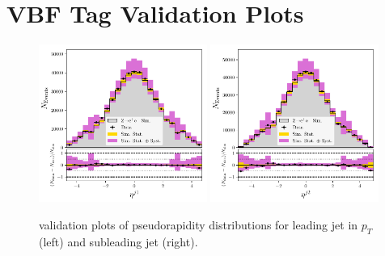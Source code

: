 

\chapter{VBF Tag \Zee Validation Plots}
\label{appendix:vbf_zee}



\begin{figure}[h!]
    \begin{center}
        \includegraphics[width=0.49\textwidth]{figures/appendix_zee/lead_jet_eta_zee_LPS.pdf}
        \includegraphics[width=0.49\textwidth]{figures/appendix_zee/sublead_jet_eta_zee_LPS.pdf}
    \end{center}
    \caption{\Zee validation plots of pseudorapidity distributions for leading jet in $p_T$ (left) and subleading jet (right).}
\end{figure}


